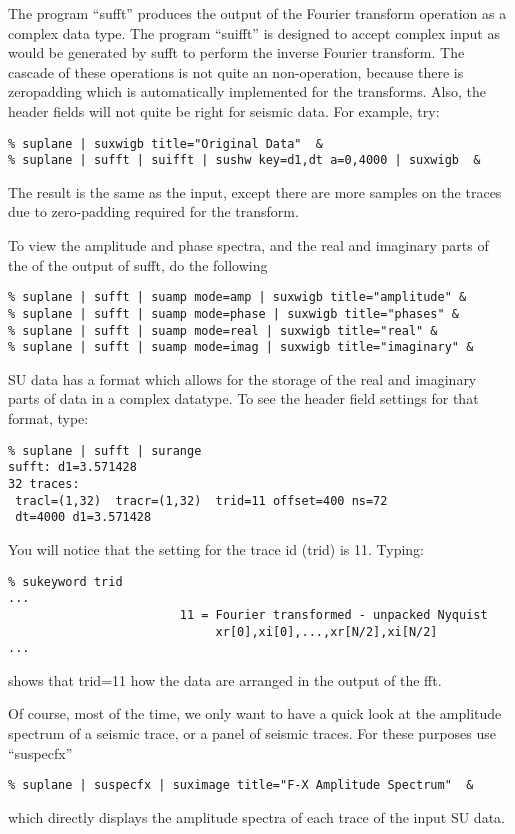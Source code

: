 {{{{{{{The program ``sufft'' produces the output of the Fourier transform
operation as a complex data type.
The program ``suifft'' is designed to accept complex input as
would be generated by sufft to perform the inverse Fourier transform.
The cascade of these operations is not quite an non-operation,
because there is zeropadding which is automatically implemented for
the transforms. Also, the header fields will not quite be
right for seismic data. For example, try:
{\small \begin{verbatim}
% suplane | suxwigb title="Original Data"  &
% suplane | sufft | suifft | sushw key=d1,dt a=0,4000 | suxwigb  &
\end{verbatim}}\noindent
The result is the same as the input, except there are more samples
on the traces due to zero-padding required for the transform.

To view the amplitude and phase spectra, and the real
and imaginary parts of the of the output of sufft, do the following
{\small \begin{verbatim}
% suplane | sufft | suamp mode=amp | suxwigb title="amplitude" &
% suplane | sufft | suamp mode=phase | suxwigb title="phases" &
% suplane | sufft | suamp mode=real | suxwigb title="real" &
% suplane | sufft | suamp mode=imag | suxwigb title="imaginary" &
\end{verbatim}}\noindent
SU data has a format which allows for the storage of the real
and imaginary parts of data in a complex datatype.
To see the header field settings for that format, type:
{\small \begin{verbatim}
% suplane | sufft | surange
sufft: d1=3.571428
32 traces:
 tracl=(1,32)  tracr=(1,32)  trid=11 offset=400 ns=72
 dt=4000 d1=3.571428 
\end{verbatim}}\noindent
You will notice that the setting for the trace id (trid)
is 11. Typing:
{\small \begin{verbatim}
% sukeyword trid
...
                        11 = Fourier transformed - unpacked Nyquist
                             xr[0],xi[0],...,xr[N/2],xi[N/2]   
...
\end{verbatim}}\noindent
shows that trid=11 how the data are arranged in the output of
the fft.

Of course, most of the time, we only want to have a quick look
at the amplitude spectrum of a seismic trace, or a panel
of seismic traces.
For these purposes use ``suspecfx''
{\small \begin{verbatim}
% suplane | suspecfx | suximage title="F-X Amplitude Spectrum"  &
\end{verbatim}}\noindent
which directly displays the amplitude spectra of each trace
of the input SU data.


}}}}}}}
